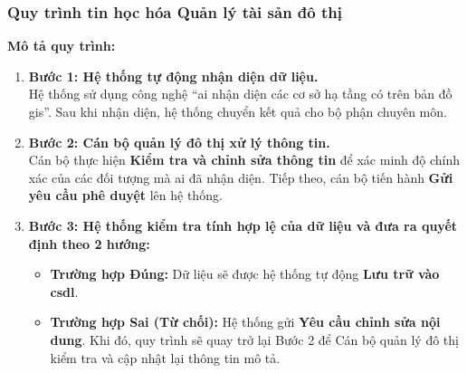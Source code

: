 \subsubsection{Quy trình tin học hóa Quản lý tài sản đô thị}

\textbf{Mô tả quy trình:}
\begin{enumerate}
    \item \textbf{Bước 1: Hệ thống tự động nhận diện dữ liệu.} \\
    Hệ thống sử dụng công nghệ ``\gls{ai} nhận diện các cơ sở hạ tầng có trên bản đồ \gls{gis}''. Sau khi nhận diện, hệ thống chuyển kết quả cho bộ phận chuyên môn.
    
    \item \textbf{Bước 2: Cán bộ quản lý đô thị xử lý thông tin.} \\
    Cán bộ thực hiện \textbf{Kiểm tra và chỉnh sửa thông tin} để xác minh độ chính xác của các đối tượng mà \gls{ai} đã nhận diện. Tiếp theo, cán bộ tiến hành \textbf{Gửi yêu cầu phê duyệt} lên hệ thống.
    
    \item \textbf{Bước 3: Hệ thống kiểm tra tính hợp lệ của dữ liệu và đưa ra quyết định theo 2 hướng:}
    \begin{itemize}
        \item \textbf{Trường hợp Đúng:} Dữ liệu sẽ được hệ thống tự động \textbf{Lưu trữ vào \gls{csdl}}.
        \item \textbf{Trường hợp Sai (Từ chối):} Hệ thống gửi \textbf{Yêu cầu chỉnh sửa nội dung}. Khi đó, quy trình sẽ quay trở lại Bước 2 để Cán bộ quản lý đô thị kiểm tra và cập nhật lại thông tin mô tả.
    \end{itemize}
\end{enumerate}
